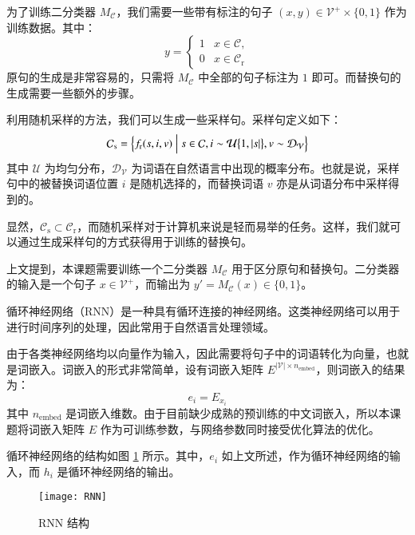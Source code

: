为了训练二分类器 $M_\mathcal{C}$，我们需要一些带有标注的句子 $(x, y) \in \mathcal{V}^+ \times \{0, 1\}$ 作为训练数据。其中：
\begin{equation}
	y = 
	\begin{cases}
		1 & x \in \mathcal{C}, \\
		0 & x \in \mathcal{C}_\text{r}
	\end{cases}
\end{equation}
原句的生成是非常容易的，只需将 $M_\mathcal{C}$ 中全部的句子标注为 $1$ 即可。而替换句的生成需要一些额外的步骤。

利用随机采样的方法，我们可以生成一些采样句。采样句定义如下：
\begin{equation}
\mathcal{C}_\text{s} = \Bigl\{f_\text{r}(s, i, v) \Bigm| s \in \mathcal{C}, i \sim \mathcal{U}\bigl\{1, |s|\bigr\}, v \sim \mathcal{D}_\mathcal{V}\Bigr\}
\end{equation}
其中 $\mathcal{U}$ 为均匀分布，$\mathcal{D}_\mathcal{V}$ 为词语在自然语言中出现的概率分布。也就是说，采样句中的被替换词语位置 $i$ 是随机选择的，而替换词语 $v$ 亦是从词语分布中采样得到的。

显然，$\mathcal{C}_\text{s} \subset \mathcal{C}_\text{r}$，而随机采样对于计算机来说是轻而易举的任务。这样，我们就可以通过生成采样句的方式获得用于训练的替换句。

\label{s:classifer rnn}
上文提到，本课题需要训练一个二分类器 $M_\mathcal{C}$ 用于区分原句和替换句。二分类器的输入是一个句子 $x \in \mathcal{V}^+$，而输出为 $y' = M_\mathcal{C}(x) \in \{0, 1\}$。

循环神经网络（RNN）是一种具有循环连接的神经网络。这类神经网络可以用于进行时间序列的处理，因此常用于自然语言处理领域。

由于各类神经网络均以向量作为输入，因此需要将句子中的词语转化为向量，也就是词嵌入。词嵌入的形式非常简单，设有词嵌入矩阵 $E^{|\mathcal{V}| \times n_{\text{embed}}}$，则词嵌入的结果为：
\begin{equation}
e_i = E_{x_i}
\end{equation}
其中 $n_{\text{embed}}$ 是词嵌入维数。由于目前缺少成熟的预训练的中文词嵌入，所以本课题将词嵌入矩阵 $E$ 作为可训练参数，与网络参数同时接受优化算法的优化。

循环神经网络的结构如图 \ref{f:rnn} 所示。其中，$e_i$ 如上文所述，作为循环神经网络的输入，而 $h_i$ 是循环神经网络的输出。

\begin{figure}[h]
	\centering
	\texttt{[image: RNN]}
	\caption{RNN 结构}
	\label{f:rnn}
	\vspace{-1em}
\end{figure}


